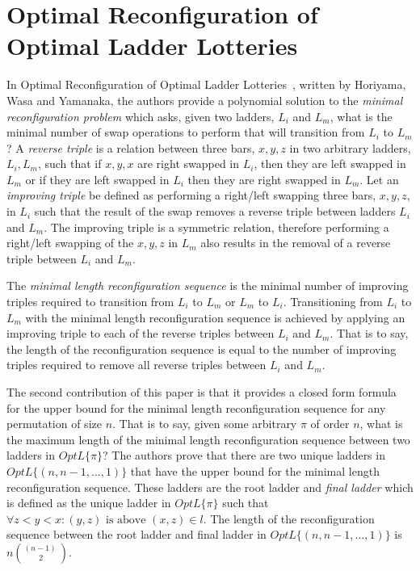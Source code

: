 
\section{Optimal Reconfiguration of Optimal Ladder Lotteries}
In Optimal Reconfiguration of Optimal Ladder Lotteries~\cite{A2}, written by Horiyama, Wasa and Yamanaka,
the authors provide a polynomial solution to the 
\emph{minimal reconfiguration problem} which asks, given 
two ladders, $L_{i}$ and  $L_{m}$, what is the minimal number of 
swap operations to perform that will transition from $L_{i}$ to $L_{m}$? A \emph{reverse triple} 
is a relation between three bars, $x,y,z$ in two arbitrary ladders, $L_{i}, L_{m}$, such that if $x,y,x$
are right swapped in $L_{i}$, then they are left swapped in $L_{m}$ or if they are 
left swapped in $L_{i}$ then they are right swapped in $L_{m}$. 
Let an \emph{improving triple} be defined as  
performing a right/left swapping three bars, $x,y,z$, in $L_{i}$ such that the 
result of the swap removes a reverse triple between
ladders $L_{i}$ and $L_{m}$. The improving triple is a symmetric 
relation, therefore performing a right/left swapping of the $x,y,z$ in $L_{m}$ also results in the 
removal of a reverse triple between $L_{i}$ and $L_{m}$.\par
The \emph{minimal length reconfiguration sequence} is the minimal number of 
improving triples required to transition from $L_{i}$ to $L_{m}$ or 
$L_{m}$ to $L_{i}$. Transitioning from $L_{i}$ to $L_{m}$ with the minimal length reconfiguration sequence 
is achieved by applying an improving triple to each of the reverse triples between 
$L_{i}$ and $L_{m}$. That is to say, the length of the reconfiguration sequence 
is equal to the number of improving triples required to remove all reverse triples between $L_{i}$ and  $L_{m}$.\par
The second contribution of this paper is that it provides a closed form formula for the 
upper bound for the minimal length reconfiguration sequence for any permutation 
of size $n$. That is to say, given some arbitrary $\pi$ of order $n$, what is the maximum 
length of the minimal length reconfiguration sequence between two ladders in $OptL\{\pi\}$?
The authors prove that there are two unique ladders in $OptL\{(n, n-1, \dots, 1)\}$ that 
have the upper bound for the minimal length reconfiguration sequence. These ladders are the root ladder and \emph{final ladder} 
which is defined as the unique ladder in $OptL\{\pi\}$ such that $\forall z < y < x: (y,z) \text{ is above } (x,z) \in l$. 
The length of the reconfiguration sequence 
between the root ladder and final ladder in $OptL\{(n, n-1, \dots, 1)\}$ is $n{(n-1)~\choose 2}$. 
